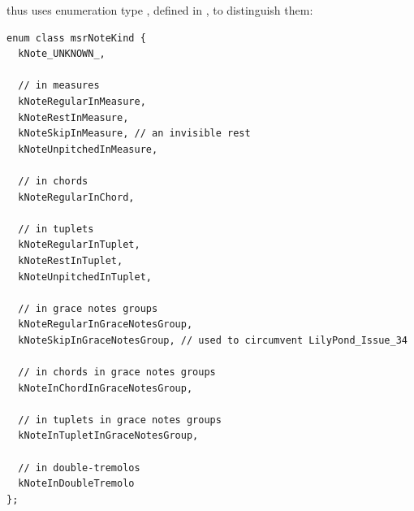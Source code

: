  thus uses enumeration type , defined in , to distinguish them:
\begin{lstlisting}[language=CPlusPlus]
enum class msrNoteKind {
  kNote_UNKNOWN_,

  // in measures
  kNoteRegularInMeasure,
  kNoteRestInMeasure,
  kNoteSkipInMeasure, // an invisible rest
  kNoteUnpitchedInMeasure,

  // in chords
  kNoteRegularInChord,

  // in tuplets
  kNoteRegularInTuplet,
  kNoteRestInTuplet,
  kNoteUnpitchedInTuplet,

  // in grace notes groups
  kNoteRegularInGraceNotesGroup,
  kNoteSkipInGraceNotesGroup, // used to circumvent LilyPond_Issue_34

  // in chords in grace notes groups
  kNoteInChordInGraceNotesGroup,

  // in tuplets in grace notes groups
  kNoteInTupletInGraceNotesGroup,

  // in double-tremolos
  kNoteInDoubleTremolo
};
\end{lstlisting}


%
%
%
%
%
%
%
%
%
%


